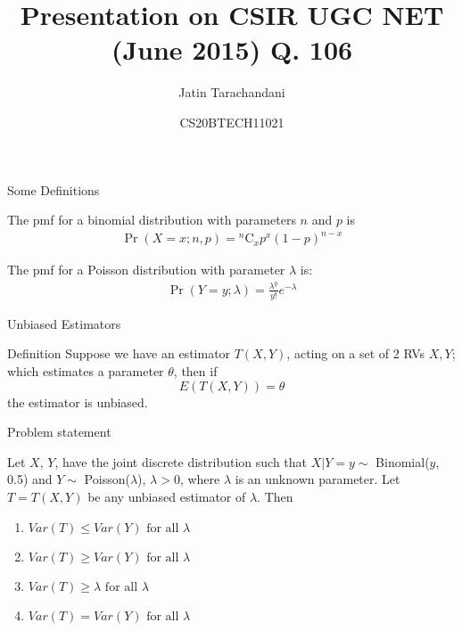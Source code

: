 \documentclass{beamer}
\title{Presentation on CSIR UGC NET (June 2015) Q. 106}
\author{Jatin Tarachandani}
\date{CS20BTECH11021}
\providecommand{\pr}[1]{\ensuremath{\Pr\left(#1\right)}}
\providecommand{\brak}[1]{\ensuremath{\left(#1\right)}}
\newcommand{\comb}[2]{{}^{#1}\mathrm{C}_{#2}}
\begin{document}
\begin{frame}
\titlepage
\end{frame}

\begin{frame}{Some Definitions}
\begin{definition}
The pmf for a binomial distribution with parameters $n$ and $p$ is
\begin{align}
    \pr{X=x;n, p}=\comb{n}{x}p^{x}\brak{1-p}^{n-x}
\end{align}
\end{definition}
\begin{definition}
The pmf for a Poisson distribution with parameter $\lambda$ is:
\begin{align}
    \pr{Y=y; \lambda}=\frac{\lambda^y}{y!} e^{-\lambda}
\end{align}
\end{definition}


\end{frame}
\begin{frame}{Unbiased Estimators}

\begin{block}{Definition}
Suppose we have an estimator $T(X, Y)$, acting on a set of 2 RVs $X, Y$; which estimates a parameter $\theta$, then if
\begin{equation}
    E\brak{T(X, Y)}=\theta
\end{equation}
the estimator is unbiased.
\end{block}
    
\end{frame}
\begin{frame}{Problem statement}
\begin{block}{
}
Let $X$, $Y$, have the joint discrete distribution such that $X|Y=y \sim$ Binomial($y$, 0.5) and $Y\sim$ Poisson($\lambda$), $\lambda>0$, where $\lambda$ is an unknown parameter. Let $T=T(X, Y)$ be any unbiased estimator of $\lambda$. Then
\begin{enumerate}
    \item  $Var(T) \leq Var(Y)  \text{ for all } \lambda$
    \item $Var(T) \geq Var(Y) \text{ for all } \lambda$
    \item $Var(T) \geq \lambda \text{ for all } \lambda$
    \item $Var(T) = Var(Y) \text{ for all } \lambda$
\end{enumerate}

\end{block}
\end{frame}
\end{document}

